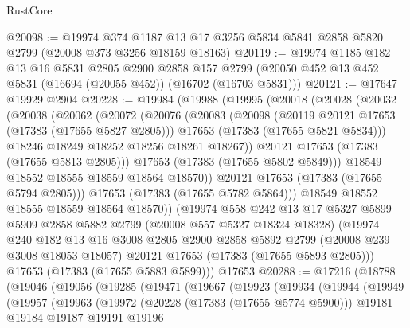 \begin{lexlean}{RustCore}
\begin{coremodule}
@20098 := @19974
    @374
    @1187
    @13
    @17
    @3256
    @5834
    @5841
    @2858
    @5820
    @2799
    (@20008 @373 @3256 @18159 @18163)
@20119 := @19974
    @1185
    @182
    @13
    @16
    @5831
    @2805
    @2900
    @2858
    @157
    @2799
    (@20050 @452 @13 @452 @5831 (@16694 (@20055 @452)) (@16702 (@16703 @5831)))
@20121 := @17647 @19929 @2904
@20228 := @19984
    (@19988
      (@19995
        (@20018
          (@20028
            (@20032
              (@20038
                (@20062
                  (@20072
                    (@20076
                      (@20083
                        (@20098
                          (@20119 @20121 @17653 (@17383 (@17655 @5827 @2805)))
                          @17653
                          (@17383 (@17655 @5821 @5834)))
                        @18246
                        @18249
                        @18252
                        @18256
                        @18261
                        @18267))
                    @20121
                    @17653
                    (@17383 (@17655 @5813 @2805)))
                  @17653
                  (@17383 (@17655 @5802 @5849)))
                @18549
                @18552
                @18555
                @18559
                @18564
                @18570))
            @20121
            @17653
            (@17383 (@17655 @5794 @2805)))
          @17653
          (@17383 (@17655 @5782 @5864)))
        @18549
        @18552
        @18555
        @18559
        @18564
        @18570))
    (@19974
      @558
      @242
      @13
      @17
      @5327
      @5899
      @5909
      @2858
      @5882
      @2799
      (@20008 @557 @5327 @18324 @18328)
      (@19974
        @240
        @182
        @13
        @16
        @3008
        @2805
        @2900
        @2858
        @5892
        @2799
        (@20008 @239 @3008 @18053 @18057)
        @20121
        @17653
        (@17383 (@17655 @5893 @2805)))
      @17653
      (@17383 (@17655 @5883 @5899)))
    @17653
@20288 := @17216
    (@18788
      (@19046
        (@19056
          (@19285
            (@19471
              (@19667
                (@19923
                  (@19934
                    (@19944
                      (@19949
                        (@19957
                          (@19963
                            (@19972
                              (@20228 (@17383 (@17655 @5774 @5900)))
                              @19181
                              @19184
                              @19187
                              @19191
                              @19196

\end{coremodule}
\end{lexlean}
